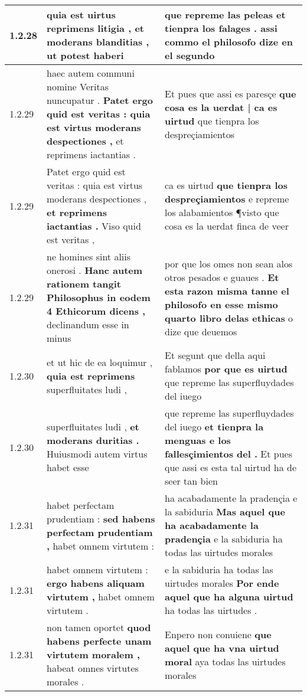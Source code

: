 \begin{tabular}{|p{1cm}|p{6.5cm}|p{6.5cm}|}
1.2.28 & quia est uirtus reprimens litigia , \textbf{ et moderans blanditias , } ut potest haberi & que repreme las peleas \textbf{ et tienpra los falages . } assi commo el philosofo dize en el segundo \\\hline
1.2.29 & haec autem communi nomine Veritas nuncupatur . \textbf{ Patet ergo quid est veritas : quia est virtus moderans despectiones , } et reprimens iactantias . & Et pues que assi es paresçe \textbf{ que cosa es la uerdat | ca es uirtud } que tienpra los despreçiamientos \\\hline
1.2.29 & Patet ergo quid est veritas : quia est virtus moderans despectiones , \textbf{ et reprimens iactantias . } Viso quid est veritas , & ca es uirtud \textbf{ que tienpra los despreçiamientos } e repreme los alabamientos ¶visto que cosa es la uerdat finca de veer \\\hline
1.2.29 & ne homines sint aliis onerosi . \textbf{ Hanc autem rationem tangit Philosophus in eodem 4 Ethicorum dicens , } declinandum esse in minus & por que los omes non sean alos otros pesados e guaues . \textbf{ Et esta razon misma tanne el philosofo en esse mismo quarto libro delas ethicas } o dize que deuemos \\\hline
1.2.30 & et ut hic de ea loquimur , \textbf{ quia est reprimens } superfluitates ludi , & Et segunt que della aqui fablamos \textbf{ por que es uirtud } que repreme las superfluydades del iuego \\\hline
1.2.30 & superfluitates ludi , \textbf{ et moderans duritias . } Huiusmodi autem virtus habet esse & que repreme las superfluydades del iuego \textbf{ et tienpra la menguas e los fallesçimientos del . } Et pues que assi es esta tal uirtud ha de seer tan bien \\\hline
1.2.31 & habet perfectam prudentiam : \textbf{ sed habens perfectam prudentiam , } habet omnem virtutem : & ha acabadamente la pradençia e la sabiduria \textbf{ Mas aquel que ha acabadamente la pradençia } e la sabiduria ha todas las uirtudes morales \\\hline
1.2.31 & habet omnem virtutem : \textbf{ ergo habens aliquam virtutem , } habet omnem virtutem . & e la sabiduria ha todas las uirtudes morales \textbf{ Por ende aquel que ha alguna uirtud } ha todas las uirtudes . \\\hline
1.2.31 & non tamen oportet \textbf{ quod habens perfecte unam virtutem moralem , } habeat omnes virtutes morales . & Enpero non conuiene \textbf{ que aquel que ha vna uirtud moral } aya todas las uirtudes morales \\\hline

\end{tabular}
